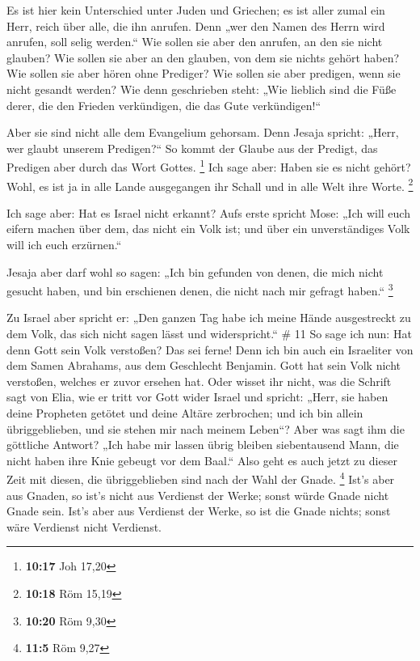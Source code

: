  Es ist hier kein Unterschied unter Juden und Griechen; es
ist aller zumal ein Herr, reich über alle, die ihn anrufen.
 Denn „wer den Namen des Herrn wird anrufen, soll selig
werden.``  Wie sollen sie aber den anrufen, an den sie
nicht glauben? Wie sollen sie aber an den glauben, von dem sie nichts
gehört haben? Wie sollen sie aber hören ohne Prediger?  Wie
sollen sie aber predigen, wenn sie nicht gesandt werden? Wie denn
geschrieben steht: „Wie lieblich sind die Füße derer, die den Frieden
verkündigen, die das Gute verkündigen!{}``

 Aber sie sind nicht alle dem Evangelium gehorsam. Denn
Jesaja spricht: „Herr, wer glaubt unserem Predigen?{}``  So
kommt der Glaube aus der Predigt, das Predigen aber durch das Wort
Gottes. \footnote{\textbf{10:17} Joh 17,20}  Ich sage aber:
Haben sie es nicht gehört? Wohl, es ist ja in alle Lande ausgegangen ihr
Schall und in alle Welt ihre Worte. \footnote{\textbf{10:18} Röm 15,19}

 Ich sage aber: Hat es Israel nicht erkannt? Aufs erste
spricht Mose: „Ich will euch eifern machen über dem, das nicht ein Volk
ist; und über ein unverständiges Volk will ich euch erzürnen.``

 Jesaja aber darf wohl so sagen: „Ich bin gefunden von
denen, die mich nicht gesucht haben, und bin erschienen denen, die nicht
nach mir gefragt haben.`` \footnote{\textbf{10:20} Röm 9,30}

 Zu Israel aber spricht er: „Den ganzen Tag habe ich meine
Hände ausgestreckt zu dem Volk, das sich nicht sagen lässt und
widerspricht.`` \# 11  So sage ich nun: Hat denn Gott sein
Volk verstoßen? Das sei ferne! Denn ich bin auch ein Israeliter von dem
Samen Abrahams, aus dem Geschlecht Benjamin.  Gott hat sein
Volk nicht verstoßen, welches er zuvor ersehen hat. Oder wisset ihr
nicht, was die Schrift sagt von Elia, wie er tritt vor Gott wider Israel
und spricht:  „Herr, sie haben deine Propheten getötet und
deine Altäre zerbrochen; und ich bin allein übriggeblieben, und sie
stehen mir nach meinem Leben``?  Aber was sagt ihm die
göttliche Antwort? „Ich habe mir lassen übrig bleiben siebentausend
Mann, die nicht haben ihre Knie gebeugt vor dem Baal.`` 
Also geht es auch jetzt zu dieser Zeit mit diesen, die übriggeblieben
sind nach der Wahl der Gnade. \footnote{\textbf{11:5} Röm 9,27}
 Ist's aber aus Gnaden, so ist's nicht aus Verdienst der
Werke; sonst würde Gnade nicht Gnade sein. Ist's aber aus Verdienst der
Werke, so ist die Gnade nichts; sonst wäre Verdienst nicht Verdienst.

